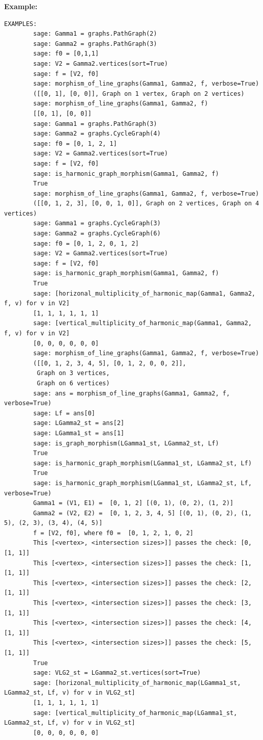 \documentclass{article}
\begin{document}
\textbf{Example:}
\begin{verbatim}
EXAMPLES:
        sage: Gamma1 = graphs.PathGraph(2)
        sage: Gamma2 = graphs.PathGraph(3) 
        sage: f0 = [0,1,1]  
        sage: V2 = Gamma2.vertices(sort=True) 
        sage: f = [V2, f0]    
        sage: morphism_of_line_graphs(Gamma1, Gamma2, f, verbose=True)  
        ([[0, 1], [0, 0]], Graph on 1 vertex, Graph on 2 vertices)
        sage: morphism_of_line_graphs(Gamma1, Gamma2, f)  
        [[0, 1], [0, 0]]
        sage: Gamma1 = graphs.PathGraph(3)   
        sage: Gamma2 = graphs.CycleGraph(4)  
        sage: f0 = [0, 1, 2, 1]    
        sage: V2 = Gamma2.vertices(sort=True)   
        sage: f = [V2, f0]          
        sage: is_harmonic_graph_morphism(Gamma1, Gamma2, f)
        True
        sage: morphism_of_line_graphs(Gamma1, Gamma2, f, verbose=True) 
        ([[0, 1, 2, 3], [0, 0, 1, 0]], Graph on 2 vertices, Graph on 4 vertices)
        sage: Gamma1 = graphs.CycleGraph(3) 
        sage: Gamma2 = graphs.CycleGraph(6) 
        sage: f0 = [0, 1, 2, 0, 1, 2] 
        sage: V2 = Gamma2.vertices(sort=True)  
        sage: f = [V2, f0]          
        sage: is_harmonic_graph_morphism(Gamma1, Gamma2, f) 
        True
        sage: [horizonal_multiplicity_of_harmonic_map(Gamma1, Gamma2, f, v) for v in V2] 
        [1, 1, 1, 1, 1, 1]
        sage: [vertical_multiplicity_of_harmonic_map(Gamma1, Gamma2, f, v) for v in V2]  
        [0, 0, 0, 0, 0, 0]
        sage: morphism_of_line_graphs(Gamma1, Gamma2, f, verbose=True) 
        ([[0, 1, 2, 3, 4, 5], [0, 1, 2, 0, 0, 2]],
         Graph on 3 vertices,
         Graph on 6 vertices)
        sage: ans = morphism_of_line_graphs(Gamma1, Gamma2, f, verbose=True) 
        sage: Lf = ans[0] 
        sage: LGamma2_st = ans[2]  
        sage: LGamma1_st = ans[1] 
        sage: is_graph_morphism(LGamma1_st, LGamma2_st, Lf) 
        True
        sage: is_harmonic_graph_morphism(LGamma1_st, LGamma2_st, Lf) 
        True
        sage: is_harmonic_graph_morphism(LGamma1_st, LGamma2_st, Lf, verbose=True) 
        Gamma1 = (V1, E1) =  [0, 1, 2] [(0, 1), (0, 2), (1, 2)]
        Gamma2 = (V2, E2) =  [0, 1, 2, 3, 4, 5] [(0, 1), (0, 2), (1, 5), (2, 3), (3, 4), (4, 5)]
        f = [V2, f0], where f0 =  [0, 1, 2, 1, 0, 2]
        This [<vertex>, <intersection sizes>]] passes the check: [0, [1, 1]]
        This [<vertex>, <intersection sizes>]] passes the check: [1, [1, 1]]
        This [<vertex>, <intersection sizes>]] passes the check: [2, [1, 1]]
        This [<vertex>, <intersection sizes>]] passes the check: [3, [1, 1]]
        This [<vertex>, <intersection sizes>]] passes the check: [4, [1, 1]]
        This [<vertex>, <intersection sizes>]] passes the check: [5, [1, 1]]
        True
        sage: VLG2_st = LGamma2_st.vertices(sort=True) 
        sage: [horizonal_multiplicity_of_harmonic_map(LGamma1_st, LGamma2_st, Lf, v) for v in VLG2_st]             
        [1, 1, 1, 1, 1, 1]
        sage: [vertical_multiplicity_of_harmonic_map(LGamma1_st, LGamma2_st, Lf, v) for v in VLG2_st]              
        [0, 0, 0, 0, 0, 0]
\end{verbatim}
\end{document}
